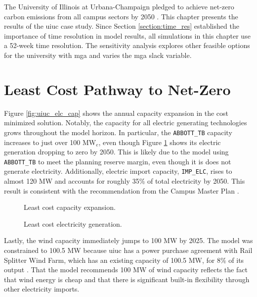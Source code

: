 The University of Illinois at Urbana-Champaign pledged to achieve net-zero carbon
emissions from all campus sectors by 2050
\cite{institute_for_sustainability_energy_and_environment_illinois_2015}. This
chapter presents the results of the \gls{uiuc} case study. Since Section
\ref{section:time_res} established the importance of time resolution in model results,
all simulations in this chapter use a 52-week time resolution. The sensitivity
analysis explores other feasible options for the university with \gls{mga} and
varies the \gls{mga} slack variable.

\section{Least Cost Pathway to Net-Zero}
Figure \ref{fig:uiuc_elc_cap} shows the annual capacity expansion in the cost
minimized solution. Notably, the capacity for all electric generating technologies
grows throughout the model horizon. In particular, the \texttt{ABBOTT\_TB} capacity
increases to just over 100 MW$_e$, even though Figure \ref{fig:uiuc_elc_gen}
shows its electric generation dropping to zero by 2050. This is likely due to
the model using \texttt{ABBOTT\_TB} to meet the planning reserve margin, even
though it is does not generate electricity. Additionally, electric import capacity, \texttt{IMP\_ELC}, rises
to almost 120 MW and accounts for roughly 35\% of total electricity by 2050.
This result is consistent with the recommendation from the Campus Master Plan
\cite{affiliated_engineers_inc_utilities_2015}.

\begin{figure}[H]
  \begin{minipage}{0.48\textwidth}
    \captionsetup{type=figure}
    \centering
    \resizebox{\columnwidth}{!}{}
    \caption[]{Least cost capacity expansion.}
    \label{fig:uiuc_elc_cap}
  \end{minipage}
  \begin{minipage}{0.48\textwidth}
    \centering
    \resizebox{\columnwidth}{!}{}
    \caption[]{Least cost electricity generation.}
    \label{fig:uiuc_elc_gen}
  \end{minipage}
\end{figure}

Lastly, the wind capacity immediately jumps to 100 MW by 2025. The model was
constrained to 100.5 MW because \gls{uiuc} has a power purchase agreement with
Rail Splitter Wind Farm, which has an existing capacity of 100.5 MW, for 8\% of
its output \cite{breitweiser_wind_2016}. That the model recommends 100 MW of
wind capacity reflects the fact that wind energy is cheap and that there is significant
built-in flexibility through other electricity imports.

